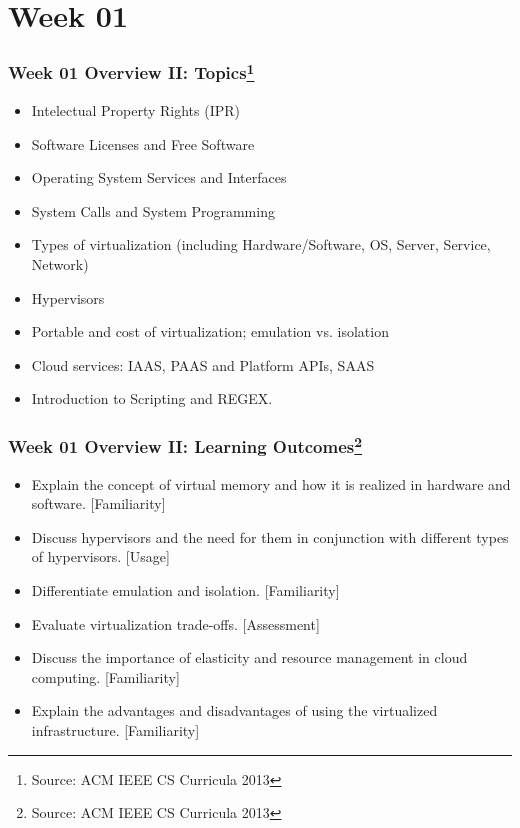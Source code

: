 
\section{Week 01}
\begin{frame}[fragile]
\frametitle{Week 01 Overview II:
Topics\footnote{Source: ACM IEEE CS Curricula 2013}}

\begin{itemize}
\item Intelectual Property Rights (IPR)
\item Software Licenses and Free Software
\item Operating System Services and Interfaces
\item System Calls and System Programming
\item Types of virtualization (including Hardware/Software, OS, Server, Service, Network) 
\item Hypervisors 
\item Portable and cost of virtualization; emulation vs. isolation 
\item Cloud services: IAAS, PAAS and Platform APIs, SAAS
\item Introduction to Scripting and REGEX.
\end{itemize}
\end{frame}

\begin{frame}[fragile]
\frametitle{Week 01 Overview II:
Learning Outcomes\footnote{Source: ACM IEEE CS Curricula 2013}}

\begin{itemize}
\item Explain the concept of virtual memory and how it is realized in hardware and software. [Familiarity] 
\item Discuss hypervisors and the need for them in conjunction with different types of hypervisors. [Usage] 
\item Differentiate emulation and isolation. [Familiarity]
\item Evaluate virtualization trade-offs. [Assessment]
\item Discuss the importance of elasticity and resource management in cloud computing. [Familiarity]
\item Explain the advantages and disadvantages of using the virtualized infrastructure. [Familiarity]
\end{itemize}
\end{frame}

